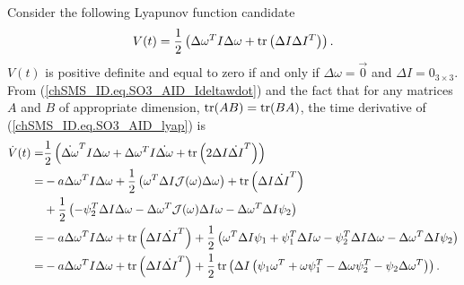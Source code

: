 Consider the following Lyapunov function candidate
%
\begin{equation}\label{chSMS_ID.eq.SO3_AID_lyap}
V(t)=\frac{1}{2}\left(\Delta \omega^{T} I \Delta \omega + 
     \operatorname{tr}\left(\Delta I \Delta I^{T}\right)\right).
\end{equation}
%
$V(t)$ is 
%
positive definite and equal to zero if and only if $\Delta
\omega=\vec{0}$ and $\Delta I=0_{3\times 3}$.
%
%
From (\ref{chSMS_ID.eq.SO3_AID_Ideltawdot}) and the fact that for any
matrices $A$ and $B$ of appropriate dimension, $\operatorname{tr}(AB)=\operatorname{tr}(BA)$,
the time derivative of (\ref{chSMS_ID.eq.SO3_AID_lyap}) is
%
\begin{align}
\dot{V}(t) 
 =&\frac{1}{2}\left(\dot{\Delta \omega}^{T} I\Delta\omega
   +\Delta \omega^{T} I \dot{\Delta \omega}
  +\operatorname{tr}\left(2\Delta I \dot{\Delta I}^{T}\right)\right)
  \nonumber  \\
 =&-a\Delta\omega^TI\Delta\omega+\frac{1}{2}\left(\omega^T\Delta I
   \mathcal{J}(\omega)\Delta \omega\right)
   + \operatorname{tr}\left(\Delta I \dot{\Delta I}^T\right)  
  \nonumber  \\
  &+\frac{1}{2}\left(-\psi_2^T\Delta I\Delta\omega
  -\Delta \omega^T\mathcal{J}(\omega)\Delta I \omega
  -\Delta \omega^T\Delta I \psi_2 \right)
  \nonumber  \\
 =&-a\Delta\omega^TI\Delta\omega+\operatorname{tr}\left(\Delta I \dot{\Delta I}^T\right)
  +\frac{1}{2}\left(
   \omega^T\Delta I\psi_1+\psi_1^T\Delta I\omega   
   -\psi_2^T\Delta I\Delta\omega-\Delta \omega^T\Delta I \psi_2\right)
  \nonumber  \\ 
 =&-a\Delta\omega^TI\Delta\omega+\operatorname{tr}\left(\Delta I \dot{\Delta I}^T\right)
  +\frac{1}{2}\operatorname{tr}\left(
   \Delta I\left(\psi_1\omega^T+\omega\psi_1^T   
   -\Delta\omega\psi_2^T-\psi_2\Delta \omega^T\right)\right). 
\end{align}


